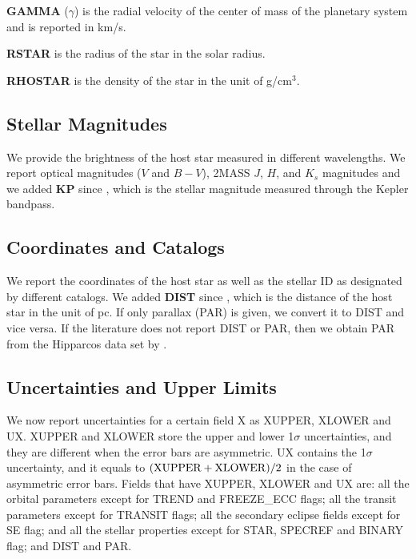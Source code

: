 \documentclass[11pt,preprint]{aastex}
\begin{document}
\begin{CJK*}{UTF8}{gbsn}
{\bf GAMMA} ($\gamma$) is the radial velocity of the center of mass of
the planetary system and is reported in km/s.

{\bf RSTAR} is the radius of the star in the solar radius.

{\bf RHOSTAR} is the density of the star in the unit of g/cm$^3$.

\subsection{Stellar Magnitudes}\label{sec:stellarmag}

We provide the brightness of the host star measured in different
wavelengths. We report optical magnitudes ($V$ and $B-V$), 2MASS $J$,
$H$, and $K_s$ magnitudes and we added {\bf KP} since
\cite{Wright2011}, which is the stellar magnitude measured through the
Kepler bandpass.

\subsection{Coordinates and Catalogs}\label{sec:coord}
We report the coordinates of the host star as well as the stellar ID
as designated by different catalogs.  We added {\bf DIST} since
\cite{Wright2011}, which is the distance of the host star in the unit
of pc. If only parallax (PAR) is given, we convert it to DIST and vice
versa. If the literature does not report DIST or PAR, then we obtain
PAR from the Hipparcos data set by \cite{van Leeuwen2009}.

\subsection{Uncertainties and Upper Limits}\label{sec:unc}

We now report uncertainties for a certain field X as XUPPER, XLOWER
and UX. XUPPER and XLOWER store the upper and lower 1$\sigma$
uncertainties, and they are different when the error bars are
asymmetric. UX contains the 1$\sigma$ uncertainty, and it equals to
$({\rm XUPPER+XLOWER})/2$ in the case of asymmetric error bars. Fields
that have XUPPER, XLOWER and UX are: all the orbital parameters except
for TREND and FREEZE\_ECC flags; all the transit parameters except for
TRANSIT flags; all the secondary eclipse fields except for SE flag;
and all the stellar properties except for STAR, SPECREF and BINARY
flag; and DIST and PAR.


\end{CJK*}
\end{document}
